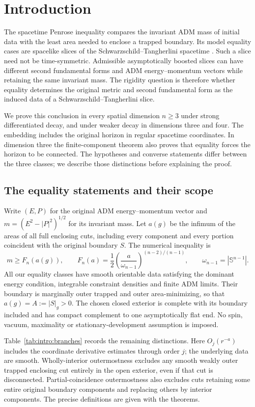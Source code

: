 \section{Introduction}
\label{sec:introduction}

The spacetime Penrose inequality compares the invariant ADM mass of
initial data with the least area needed to enclose a trapped boundary.
Its model equality cases are spacelike slices of the
Schwarzschild--Tangherlini spacetime \cite{Tangherlini1963}. Such a slice
need not be time-symmetric. Admissible asymptotically boosted slices can
have different second fundamental forms and ADM energy--momentum vectors
while retaining the same invariant mass. The rigidity question is therefore
whether equality determines the original metric and second fundamental
form as the induced data of a Schwarzschild--Tangherlini slice.

We prove this conclusion in every spatial dimension $n\ge3$ under
strong differentiated decay, and under weaker decay in dimensions
three and four. The embedding includes the original horizon in regular
spacetime coordinates. In dimension three the finite-component theorem
also proves that equality forces the horizon to be connected. The
hypotheses and converse statements differ between the three classes;
we describe those distinctions before explaining the proof.

\subsection{The equality statements and their scope}

Write $(E,P)$ for the original ADM energy--momentum vector and
$m=(E^2-|P|^2)^{1/2}$ for its invariant mass. Let $a(g)$ be the
infimum of the areas of all full enclosing cuts, including every
component and every portion coincident with the original boundary $S$.
The numerical inequality is
\[
 m\ge F_n(a(g)),\qquad
 F_n(a)=\frac12\left(\frac{a}{\omega_{n-1}}\right)^{(n-2)/(n-1)},
 \qquad \omega_{n-1}=|\mathbb S^{n-1}|.
\]
All our equality classes have smooth orientable data satisfying the
dominant energy condition, integrable constraint densities and finite
ADM limits. Their boundary is marginally outer trapped and outer
area-minimizing, so that $a(g)=A:=|S|_g>0$. The chosen closed exterior
is complete with its boundary included and has compact complement to
one asymptotically flat end. No spin, vacuum, maximality or
stationary-development assumption is imposed.

Table~\ref{tab:intro:branches} records the remaining distinctions.
Here $O_j(r^{-a})$ includes the coordinate derivative estimates through
order $j$; the underlying data are smooth. Wholly-interior outermostness
excludes any smooth weakly outer trapped enclosing cut entirely in the
open exterior, even if that cut is disconnected. Partial-coincidence
outermostness also excludes cuts retaining some entire original
boundary components and replacing others by interior components. The
precise definitions are given with the theorems.

